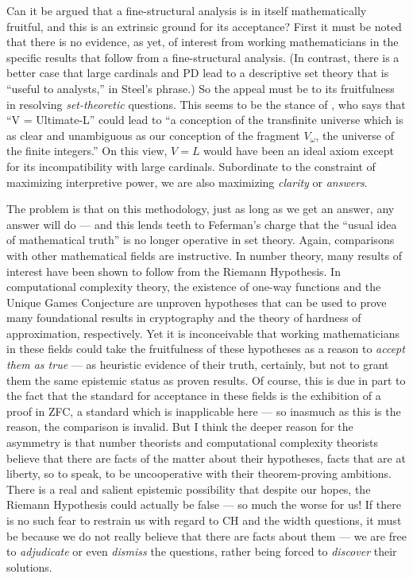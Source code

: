 \documentclass[letterpaper,12pt]{article}
\begin{document}
Can it be argued that a fine-structural analysis is in itself mathematically fruitful, and this is an extrinsic ground for its acceptance? First it must be noted that there is no evidence, as yet, of interest from working mathematicians in the specific results that follow from a fine-structural analysis. (In contrast, there is a better case that large cardinals and PD lead to a descriptive set theory that is ``useful to analysts,'' in Steel's \citeyearpar{feferman2000does} phrase.) So the appeal must be to its fruitfulness in resolving \emph{set-theoretic} questions. This seems to be the stance of \cite{woodin2009continuum}, who says that ``V = Ultimate-L'' could lead to ``a conception of the transfinite universe which is as clear and unambiguous as our conception of the fragment $V_\omega$, the universe of the finite integers.'' On this view, $V = L$ would have been an ideal axiom except for its incompatibility with large cardinals. Subordinate to the constraint of maximizing interpretive power, we are also maximizing \emph{clarity} or \emph{answers}.

The problem is that on this methodology, just as long as we get an answer, any answer will do --- and this lends teeth to Feferman's charge that the ``usual idea of mathematical truth'' is no longer operative in set theory. Again, comparisons with other mathematical fields are instructive. In number theory, many results of interest have been shown to follow from the Riemann Hypothesis. In computational complexity theory, the existence of one-way functions \citep{Goldreich:2006:FCV:1202577} and the Unique Games Conjecture \citep{trevisan2012khot} are unproven hypotheses that can be used to prove many foundational results in cryptography and the theory of hardness of approximation, respectively. Yet it is inconceivable that working mathematicians in these fields could take the fruitfulness of these hypotheses as a reason to \emph{accept them as true} --- as heuristic evidence of their truth, certainly, but not to grant them the same epistemic status as proven results. Of course, this is due in part to the fact that the standard for acceptance in these fields is the exhibition of a proof in ZFC, a standard which is inapplicable here --- so inasmuch as this is the reason, the comparison is invalid. But I think the deeper reason for the asymmetry is that number theorists and computational complexity theorists believe that there are facts of the matter about their hypotheses, facts that are at liberty, so to speak, to be uncooperative with their theorem-proving ambitions. There is a real and salient epistemic possibility that despite our hopes, the Riemann Hypothesis could actually be false --- so much the worse for us! If there is no such fear to restrain us with regard to CH and the width questions, it must be because we do not really believe that there are facts about them --- we are free to \emph{adjudicate} or even \emph{dismiss} the questions, rather being forced to \emph{discover} their solutions.
\end{document}
